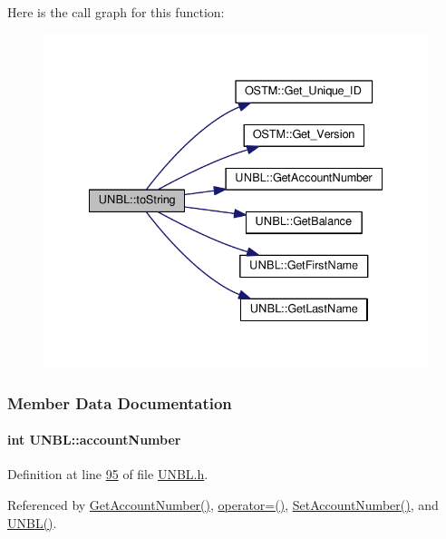 Here is the call graph for this function\+:\nopagebreak
\begin{figure}[H]
\begin{center}
\leavevmode
\includegraphics[width=335pt]{class_u_n_b_l_a76d8bba21d64d79d8de63763b8acc1fd_a76d8bba21d64d79d8de63763b8acc1fd_cgraph}
\end{center}
\end{figure}




\subsubsection{Member Data Documentation}
\paragraph[{\texorpdfstring{account\+Number}{accountNumber}}]{\setlength{\rightskip}{0pt plus 5cm}int U\+N\+B\+L\+::account\+Number\hspace{0.3cm}{\ttfamily [private]}}\hypertarget{class_u_n_b_l_a90763c3044159862bcb9cd51d6b09f34_a90763c3044159862bcb9cd51d6b09f34}{}\label{class_u_n_b_l_a90763c3044159862bcb9cd51d6b09f34_a90763c3044159862bcb9cd51d6b09f34}


Definition at line \hyperlink{_u_n_b_l_8h_source_l00095}{95} of file \hyperlink{_u_n_b_l_8h_source}{U\+N\+B\+L.\+h}.



Referenced by \hyperlink{_u_n_b_l_8cpp_source_l00078}{Get\+Account\+Number()}, \hyperlink{_u_n_b_l_8h_source_l00062}{operator=()}, \hyperlink{_u_n_b_l_8cpp_source_l00074}{Set\+Account\+Number()}, and \hyperlink{_u_n_b_l_8h_source_l00024}{U\+N\+B\+L()}.

